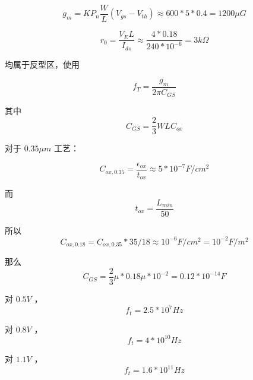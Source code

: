 \documentclass[lang=cn,11pt,a4paper,cite=authoryear]{elegantpaper}
\begin{document}
\[g_m = KP_n \frac{W}{L} (V_{gs}-V_{th}) \approx 600 * 5 * 0.4 = 1200 \mu G\] 

\[r_0 = \frac{V_E L}{I_{ds}} \approx \frac{4 * 0.18}{240 * 10^{-6}} = 3 k\Omega\]



均属于反型区，使用 

\[f_T = \frac{g_m}{2 \pi C_{GS}}\]

其中 \[C_{GS} = \frac{2}{3} WL C_{ox}\]

对于 \(0.35 \mu m\) 工艺： 

\[C_{ox, 0.35} = \frac{\epsilon_{ox}}{t_{ox}} \approx 5 * 10^{-7} F/cm^2\]

而 \[t_{ox} = \frac{L_{min}}{50}\]

所以 \[C_{ox, 0.18} = C_{ox, 0.35} * 35 / 18 \approx 10^{-6} F/cm^2 = 10^{-2} F/m^2\]

那么 \[C_{GS} = \frac{2}{3} \mu * 0.18 \mu * 10^{-2} = 0.12 * 10^{-14} F\] 

对 \(0.5 V\) ，\[f_t = 2.5 * 10^{7} Hz\]

对 \(0.8 V\) ，\[f_t = 4 * 10^{10} Hz\]

对 \(1.1 V\) ，\[f_t = 1.6 * 10^{11} Hz\]





\end{document}
